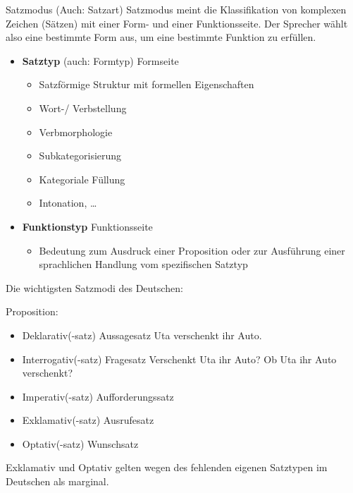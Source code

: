 \begin{frame}

\begin{block}{Satzmodus (Auch: Satzart)}
Satzmodus meint die Klassifikation von komplexen Zeichen (Sätzen) mit einer Form- und einer Funktionsseite. Der Sprecher wählt also eine bestimmte Form aus, um eine bestimmte Funktion zu erfüllen.
\end{block}

\begin{itemize}
	\item \textbf{Satztyp} (auch: Formtyp) \ras Formseite
	\begin{itemize}
		\item Satzförmige Struktur mit formellen Eigenschaften
		\item Wort-/ Verbstellung
		\item Verbmorphologie
		\item Subkategorisierung
		\item Kategoriale Füllung
		\item Intonation, \dots
	\end{itemize}
	\item \textbf{Funktionstyp} \ras Funktionsseite
	\begin{itemize}
		\item Bedeutung zum Ausdruck einer Proposition oder zur Ausführung einer sprachlichen Handlung vom spezifischen Satztyp
	\end{itemize}
\end{itemize}

\end{frame}


\begin{frame}

Die wichtigsten Satzmodi des Deutschen:

\ea Proposition: 
\z

\begin{itemize}
	\item Deklarativ(-satz) \ras Aussagesatz
	\ea Uta verschenkt ihr Auto.
	\z
	
	\item Interrogativ(-satz) \ras Fragesatz
	\ea Verschenkt Uta ihr Auto?
	\ex Ob Uta ihr Auto verschenkt?
	\z
	
	\item Imperativ(-satz) \ras Aufforderungssatz
	\item Exklamativ(-satz) \ras Ausrufesatz
	\item Optativ(-satz) \ras Wunschsatz
\end{itemize}

Exklamativ und Optativ gelten wegen des fehlenden eigenen Satztypen im Deutschen als marginal.


\end{frame}



